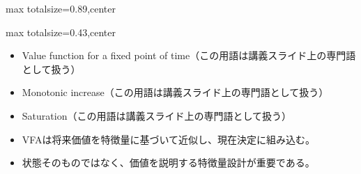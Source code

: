 \begin{minipage}[t]{0.58\textwidth}
\begin{adjustbox}{max totalsize={\textwidth}{0.89\textheight},center}
\begin{minipage}{\textwidth}
\end{minipage}
\end{adjustbox}
\end{minipage}


\clearpage
{}
\begin{minipage}[t]{0.405\textwidth}
\begin{adjustbox}{max totalsize={\textwidth}{0.43\textheight},center}
\begin{minipage}{\textwidth}\scriptsize
{}\begin{itemize}
\item Value function for a fixed point of time（この用語は講義スライド上の専門語として扱う）
\item Monotonic increase（この用語は講義スライド上の専門語として扱う）
\item Saturation（この用語は講義スライド上の専門語として扱う）
\end{itemize}\begin{itemize}
\item VFAは将来価値を特徴量に基づいて近似し、現在決定に組み込む。
\item 状態そのものではなく、価値を説明する特徴量設計が重要である。
\end{itemize}
\end{minipage}
\end{adjustbox}
\end{minipage}\hfill
